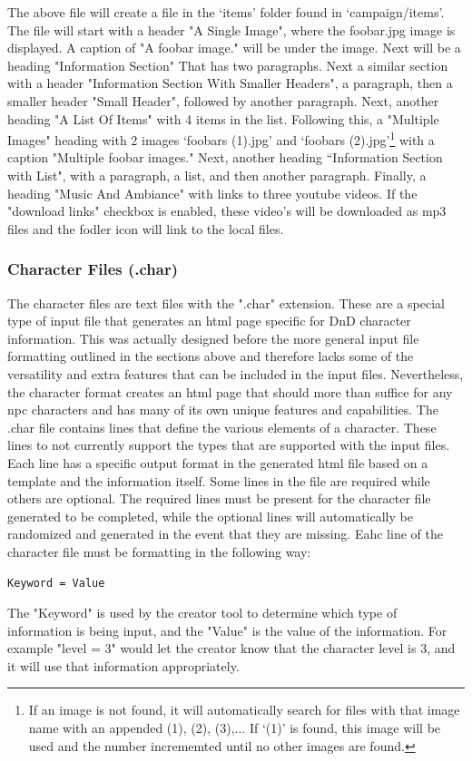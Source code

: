 The above file will create a file in the `items' folder found in `campaign/items'. The file will start with a header "A Single Image", where the foobar.jpg image is displayed. A caption of "A foobar image." will be under the image. Next will be a heading "Information Section" That has two paragraphs. Next a similar section with a header "Information Section With Smaller Headers", a paragraph, then a smaller header "Small Header", followed by another paragraph. Next, another heading "A List Of Items" with 4 items in the list. Following this, a "Multiple Images" heading with 2 images `foobars (1).jpg' and `foobars (2).jpg'\footnote{If an image is not found, it will automatically search for files with that image name with an appended (1), (2), (3),... If `(1)' is found, this image will be used and the number incrememted until no other images are found.} with a caption "Multiple foobar images." Next, another heading ``Information Section with List", with a paragraph, a list, and then another paragraph. Finally, a heading "Music And Ambiance" with links to three youtube videos. If the "download links" checkbox is enabled, these video's will be downloaded as mp3 files and the fodler icon will link to the local files.






\subsubsection{Character Files (.char)}

The character files are text files with the ".char" extension. These are a special type of input file that generates an html page specific for DnD character information. This was actually designed before the more general input file formatting outlined in the sections above and therefore lacks some of the versatility and extra features that can be included in the input files. Nevertheless, the character format creates an html page that should more than suffice for any npc characters and has many of its own unique features and capabilities. The .char file contains lines that define the various elements of a character. These lines to not currently support the types that are supported with the input files. Each line has a specific output format in the generated html file based on a template and the information itself. Some lines in the file are required while others are optional. The required lines must be present for the character file generated to be completed, while the optional lines will automatically be randomized and generated in the event that they are missing. Eahc line of the character file must be formatting in the following way:
\begin{lstlisting}
Keyword = Value
\end{lstlisting}
The "Keyword" is used by the creator tool to determine which type of information is being input, and the "Value" is the value of the information. For example "level = 3" would let the creator know that the character level is 3, and it will use that information appropriately.

